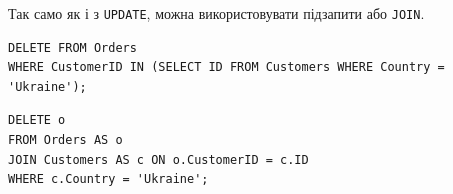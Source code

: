 \documentclass{article}
\begin{document}
\begin{enumerate}[label=\arabic*., leftmargin=*]
        Так само як і з \texttt{UPDATE}, можна використовувати підзапити або \texttt{JOIN}.
        \begin{CodeBox}
        \begin{verbatim}
DELETE FROM Orders
WHERE CustomerID IN (SELECT ID FROM Customers WHERE Country = 'Ukraine');
        \end{verbatim}
        \end{CodeBox}
        \begin{CodeBox}
        \begin{verbatim}
DELETE o
FROM Orders AS o
JOIN Customers AS c ON o.CustomerID = c.ID
WHERE c.Country = 'Ukraine';
        \end{verbatim}
        \end{CodeBox}
        
    \end{enumerate}
\end{document}
